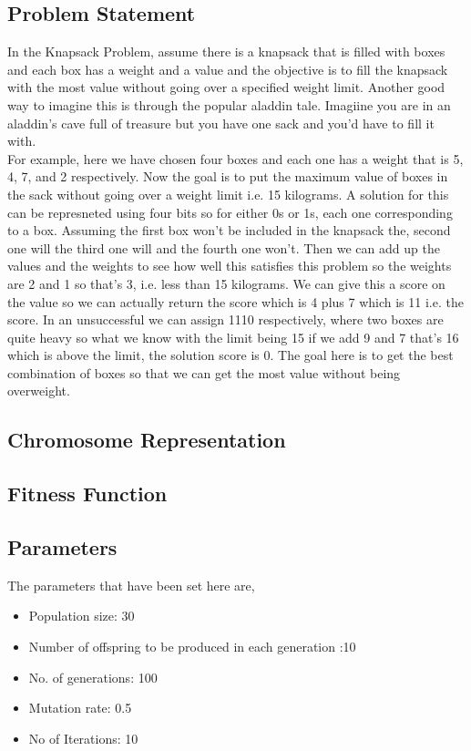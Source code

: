 \documentclass[11pt, letterpaper]{article}
\begin{document}
\subsection{Problem Statement}
In the Knapsack Problem, assume there is a knapsack that is filled with boxes and each box has a 
weight and a value and the objective is to fill the knapsack with the most value without going over 
a specified weight limit. Another good way to imagine this is through the popular aladdin tale. 
Imagiine you are in an aladdin's cave full of treasure but you have one sack and you'd have to fill 
it with.\\
For example, here we have chosen four boxes and each one has a weight that is 5, 4, 7, and 2 
respectively. Now the goal is to put the maximum value of boxes in the sack without going over a 
weight limit i.e. 15 kilograms. A solution for this can be represneted using four bits so for either 0s 
or 1s, each one corresponding to a box. Assuming the first box
won't be included in the knapsack 
the, second one will the third one will and the fourth one won't. Then we can add up the values 
and the weights to see how well this satisfies this problem so the weights are 2 and 1 so that's 3, i.e. 
less than 15 kilograms. We can give this a score on the
value so we can actually return the score 
which is 4 plus 7 which is 11 i.e. the score. In an unsuccessful we can assign 1110 respectively, 
where two boxes are quite heavy so what we know with the limit being 15 if we add 9 and 7 that's 
16 which is above the limit, the solution score is 0. The goal here is to get the best combination of 
boxes so that we can get the most value without being overweight.

\subsection{Chromosome Representation}

\subsection{Fitness Function}

\subsection{Parameters}
The parameters that have been set here are,
\begin{itemize}
    \item Population size: 30
    \item Number of offspring to be produced in each generation :10
    \item No. of generations: 100
    \item Mutation rate: 0.5
    \item No of Iterations: 10
\end{itemize}
\end{document}

